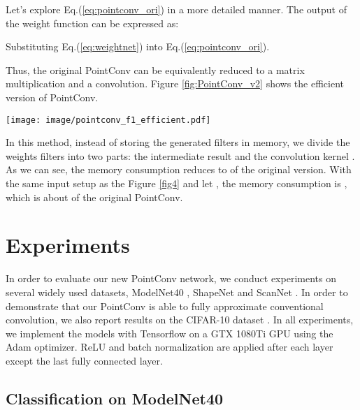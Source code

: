 \documentclass[10pt,twocolumn,letterpaper]{article}
\begin{document}
\vspace{-0.2in}


Let's explore Eq.(\ref{eq:pointconv_ori}) in a more detailed manner. The output of the weight function can be expressed as:

\vspace{-0.2in}


Substituting Eq.(\ref{eq:weightnet}) into Eq.(\ref{eq:pointconv_ori}).

\vspace{-0.1in}
\begin{scriptsize}

\end{scriptsize}
\vskip -0.2in
Thus, the original PointConv can be equivalently reduced to a matrix multiplication and a  convolution. Figure \ref{fig:PointConv_v2} shows the efficient version of PointConv.

\begin{figure*}
    \centering
    \texttt{[image: image/pointconv\_f1\_efficient.pdf]}
    \caption{\textbf{Efficient PointConv.} The memory efficient version of PointConv on one local region with  points.}
    \label{fig:PointConv_v2}
    \vskip -0.15in
\end{figure*}

In this method, instead of storing the generated filters in memory, we divide the weights filters into two parts: the intermediate result  and the convolution kernel . As we can see, the memory consumption reduces to  of the original version. With the same input setup as the Figure \ref{fig4} and let , the memory consumption is , which is about  of the original PointConv. 
\section{Experiments}

In order to evaluate our new PointConv network, we conduct experiments on several widely used datasets, ModelNet40 \cite{wu20153d},  ShapeNet  \cite{chang2015shapenet} and  ScanNet \cite{dai2017scannet}. In order to demonstrate that our PointConv is able to fully approximate conventional convolution, we also report results on the CIFAR-10 dataset \cite{krizhevsky2009learning}. In all experiments, we implement the models with Tensorflow on a GTX 1080Ti GPU using the Adam optimizer. ReLU and batch normalization are applied after each layer except the last fully connected layer. 

\subsection{Classification on ModelNet40}
\end{document}
